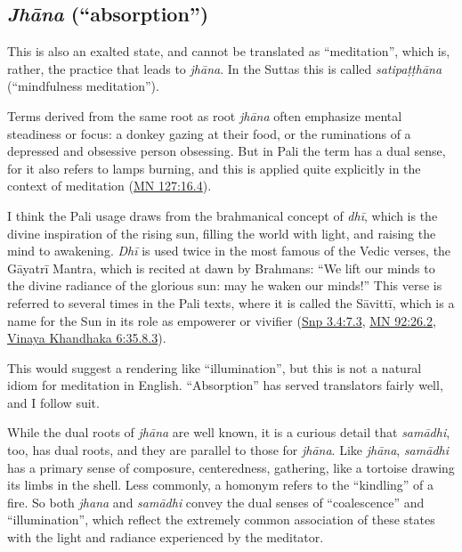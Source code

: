 \documentclass[12pt,openany]{book}%
\begin{document}
\subsection*{\textit{\textsanskrit{Jhāna}} (“absorption”)}

This is also an exalted state, and cannot be translated as “meditation”, which is, rather, the practice that leads to \textit{\textsanskrit{jhāna}}. In the Suttas this is called \textit{\textsanskrit{satipaṭṭhāna}} (“mindfulness meditation”).

Terms derived from the same root as root \textit{\textsanskrit{jhāna}} often emphasize mental steadiness or focus: a donkey gazing at their food, or the ruminations of a depressed and obsessive person obsessing. But in Pali the term has a dual sense, for it also refers to lamps burning, and this is applied quite explicitly in the context of meditation (\href{https://suttacentral.net/mn127/en/sujato\#16.4}{MN 127:16.4}).

I think the Pali usage draws from the brahmanical concept of \textit{\textsanskrit{dhī}}, which is the divine inspiration of the rising sun, filling the world with light, and raising the mind to awakening. \textit{\textsanskrit{Dhī}} is used twice in the most famous of the Vedic verses, the \textsanskrit{Gāyatrī} Mantra,  which is recited at dawn by Brahmans: “We lift our minds to the divine radiance of the glorious sun: may he waken our minds!” This verse is referred to several times in the Pali texts, where it is called the \textsanskrit{Sāvittī}, which is a name for the Sun in its role as empowerer or vivifier (\href{https://suttacentral.net/snp3.4/en/sujato\#7.3}{Snp 3.4:7.3}, \href{https://suttacentral.net/mn92/en/sujato\#26.2}{MN 92:26.2}, \href{https://suttacentral.net/pli{-}tv{-}kd6/en/brahmali\#35.8.3}{Vinaya Khandhaka 6:35.8.3}).

This would suggest a rendering like “illumination”, but this is not a natural idiom for meditation in English. “Absorption” has served translators fairly well, and I follow suit.

While the dual roots of \textit{\textsanskrit{jhāna}} are well known, it is a curious detail that \textit{\textsanskrit{samādhi}}, too, has dual roots, and they are parallel to those for \textit{\textsanskrit{jhāna}}. Like \textit{\textsanskrit{jhāna}}, \textit{\textsanskrit{samādhi}} has a primary sense of composure, centeredness, gathering, like a tortoise drawing its limbs in the shell. Less commonly, a homonym refers to the “kindling” of a fire. So both \textit{jhana} and \textit{\textsanskrit{samādhi}} convey the dual senses of “coalescence” and “illumination”, which reflect the extremely common association of these states with the light and radiance experienced by the meditator.
\end{document}
